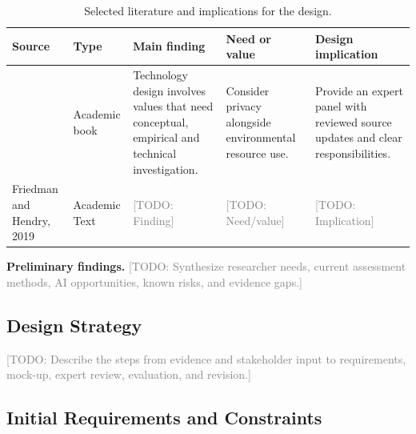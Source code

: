 \documentclass[11pt,a4paper]{article}
\newcommand{\placeholder}[1]{\textcolor{gray}{[TODO: #1]}}
\begin{document}
\begin{table}[htbp]
\centering
\small
\begin{tabularx}{\textwidth}{@{}p{}p{}XXp{}@{}}
\toprule
Source & Type & Main finding & Need or value & Design implication \\
\midrule
\citet{friedman2019shaping}
& Academic book  
& Technology design involves values that need conceptual, empirical and technical investigation.
& Consider privacy alongside environmental resource use. 
& Provide an expert panel with reviewed source updates and clear responsibilities.  \\
Friedman and Hendry, 2019
& Academic Text & \placeholder{Finding} & \placeholder{Need/value} & \placeholder{Implication} \\
\bottomrule
\end{tabularx}
\caption{Selected literature and implications for the design.}
\label{tab:literature}

\end{table}

\textbf{Preliminary findings.}
\placeholder{Synthesize researcher needs, current assessment methods, AI opportunities, known risks, and evidence gaps.}


\FloatBarrier
\subsection{Design Strategy}
\placeholder{Describe the steps from evidence and stakeholder input to requirements, mock-up, expert review, evaluation, and revision.}


\FloatBarrier
\subsection{Initial Requirements and Constraints}
\end{document}
